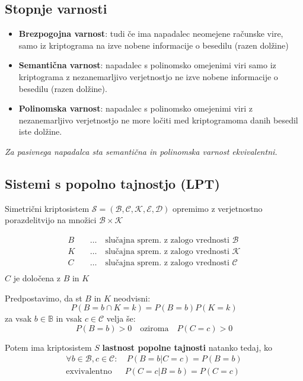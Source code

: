 \begin{multicols}{5}
\subsection*{Stopnje varnosti}
\begin{itemize}
	\item \textbf{Brezpogojna varnost}: tudi če ima napadalec neomejene računske vire, samo iz kriptograma na izve nobene informacije o besedilu (razen dolžine)
	\item \textbf{Semantična varnost}: napadalec s polinomsko omejenimi viri samo iz kriptograma z nezanemarljivo verjetnostjo ne izve nobene informacije o besedilu (razen dolžine).
	\item \textbf{Polinomska varnost}: napadalec s polinomsko omejenimi viri z nezanemarljivo verjetnostjo ne more ločiti med kriptogramoma danih besedil iste dolžine.
\end{itemize}
\textit{Za pasivnega napadalca sta semantična in polinomska varnost ekvivalentni.}

\subsection*{Sistemi s popolno tajnostjo (LPT)}
Simetrični kriptosistem $\mathcal{S} = (\mathcal{B}, \mathcal{C}, \mathcal{K}, \mathcal{E}, \mathcal{D})$ opremimo
z verjetnostno porazdelitvijo na množici $\mathcal{B} \times \mathcal{K}$

\begin{align*}
	B \quad &\dots \quad \text{slučajna sprem. z zalogo vrednosti } \mathcal{B} \\
	K \quad &\dots \quad \text{slučajna sprem. z zalogo vrednosti } \mathcal{K} \\
	C \quad &\dots \quad \text{slučajna sprem. z zalogo vrednosti } \mathcal{C} \\
\end{align*}
$C$ je določena z $B$ in $K$

Predpostavimo, da st $B$ in $K$ neodvisni:
\[ P(B = b \cap K = k) = P(B = b) P(K = k) \]
za vsak $b \in \mathbb{B}$ in vsak $c \in \mathcal{C}$ velja še:
\[ P(B = b) > 0 \quad \text{oziroma} \quad P(C = c) > 0 \]

Potem ima kriptosistem $S$ \textbf{lastnost popolne tajnosti} natanko tedaj, ko
\begin{align*}
	\forall b \in \mathcal{B}, c \in \mathcal{C}:& \ P(B = b | C = c) = P(B = b) \\
	\text{exvivalentno} & P(C = c | B = b) = P(C = c)
\end{align*}


\end{multicols}
